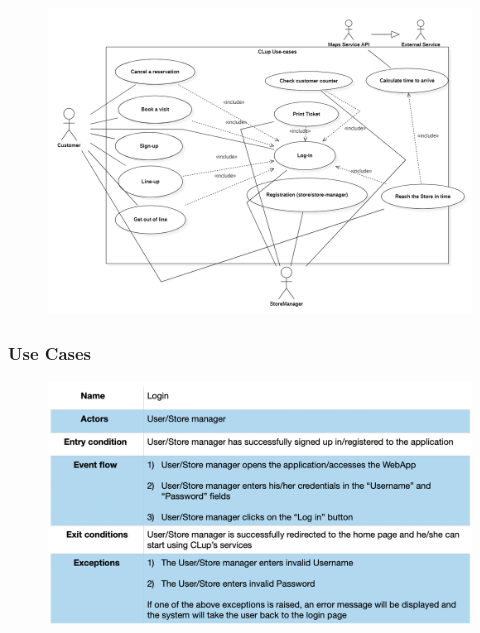 \documentclass{article}
\begin{document}
\begin{figure}[H]
  \includegraphics[width=\linewidth]{useCasesDiagram.png}
  
\end{figure}

\subsubsection{Use Cases}

\begin{figure}[H]
  \includegraphics[width=\linewidth]{LoginUseCase.png}
  
\end{figure}
\end{document}
